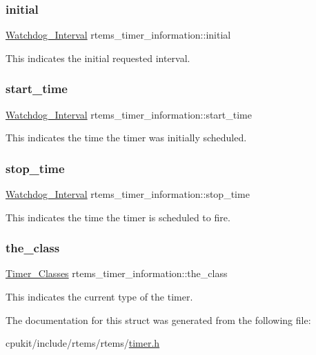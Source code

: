 \subsubsection{\texorpdfstring{initial}{initial}}
{\footnotesize\ttfamily \mbox{\hyperlink{group__RTEMSScoreWatchdog_gaa1834fd7531ca9bb5c4ca6fd990388d5}{Watchdog\+\_\+\+Interval}} rtems\+\_\+timer\+\_\+information\+::initial}

This indicates the initial requested interval. \mbox{\label{structrtems__timer__information_af88f83d48629973ba59a5f0578b80831}} 
\subsubsection{\texorpdfstring{start\_time}{start\_time}}
{\footnotesize\ttfamily \mbox{\hyperlink{group__RTEMSScoreWatchdog_gaa1834fd7531ca9bb5c4ca6fd990388d5}{Watchdog\+\_\+\+Interval}} rtems\+\_\+timer\+\_\+information\+::start\+\_\+time}

This indicates the time the timer was initially scheduled. \mbox{\label{structrtems__timer__information_a4dffa761b2a429b497d83e9f0d60b46c}} 
\subsubsection{\texorpdfstring{stop\_time}{stop\_time}}
{\footnotesize\ttfamily \mbox{\hyperlink{group__RTEMSScoreWatchdog_gaa1834fd7531ca9bb5c4ca6fd990388d5}{Watchdog\+\_\+\+Interval}} rtems\+\_\+timer\+\_\+information\+::stop\+\_\+time}

This indicates the time the timer is scheduled to fire. \mbox{\label{structrtems__timer__information_a9712f6b86dd6e8808110e41d259bb8bb}} 
\subsubsection{\texorpdfstring{the\_class}{the\_class}}
{\footnotesize\ttfamily \mbox{\hyperlink{group__ClassicTimer_gaca88ac1e833f63ec72d38e07677f2f27}{Timer\+\_\+\+Classes}} rtems\+\_\+timer\+\_\+information\+::the\+\_\+class}

This indicates the current type of the timer. 

The documentation for this struct was generated from the following file\+:\begin{DoxyCompactItemize}
\item 
cpukit/include/rtems/rtems/\mbox{\hyperlink{cpukit_2include_2rtems_2rtems_2timer_8h}{timer.\+h}}\end{DoxyCompactItemize}

